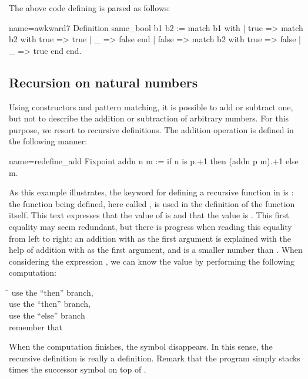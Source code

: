 The above code defining  is parsed as follows:

\begin{coq}{name=awkward7}{}
Definition same_bool b1 b2 :=
  match b1 with
  | true => match b2 with true => true | _ => false end
  | false => match b2 with true => false | _ => true end
  end.
\end{coq}


\subsection{Recursion on natural numbers}\label{ssec:recnat}


Using constructors and pattern matching, it is possible to add or
subtract one, but not to describe the addition or subtraction of
arbitrary numbers. For this purpose, we resort to recursive
definitions. The addition operation is defined in the
following manner:

\begin{coq}{name=redefine_add}{}
Fixpoint addn n m :=
  if n is p.+1 then (addn p m).+1 else m.
\end{coq}
As this example illustrates, the keyword for defining a recursive
function in \Coq{} is : the function being
defined, here called , is used in the definition of the
function  itself.  This text expresses that the value of
 is
 and that the value  is .
This first equality may
seem redundant, but there is progress when reading this equality from
left to right: an addition with  as the first argument
is explained with the help of addition with  as the first
argument, and  is a smaller number than .  When considering the
expression , we can know the value by performing the following
computation:
\begin{tabbing}
\=\kill
{} \> use the ``then'' branch, \\
 \> use the ``then'' branch, \\
 \> use the ``else'' branch\\
\> remember that 
\end{tabbing}
When the computation finishes, the symbol  disappears.  In
this sense, the recursive definition is really a definition.  Remark that
the  program simply stacks  times the successor symbol
on top of .

